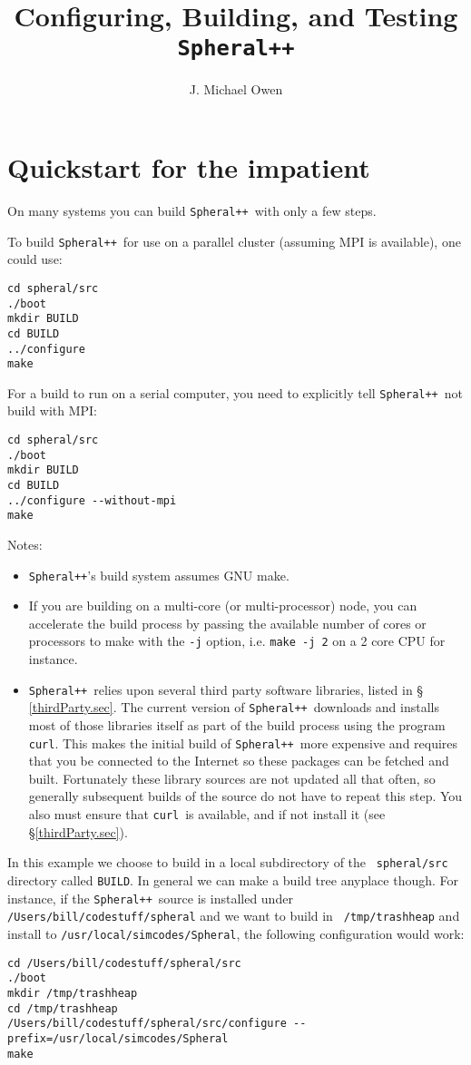 \documentclass{article}
\newcommand{\Spheral}{{\tt Spheral++}}
\newcommand{\curl}{{\tt curl}}
\begin{document}
\title{Configuring, Building, and Testing \Spheral}
\author{J. Michael Owen}
\maketitle

\section{Quickstart for the impatient}
\label{quick.sec}
On many systems you can build \Spheral\ with only a few steps.

To build \Spheral\ for use on a parallel cluster (assuming MPI is available),
one could use:
\begin{verbatim}
cd spheral/src
./boot
mkdir BUILD
cd BUILD
../configure
make
\end{verbatim}

For a build to run on a serial computer, you need to explicitly tell
\Spheral\ not build with MPI:
\begin{verbatim}
cd spheral/src
./boot
mkdir BUILD
cd BUILD
../configure --without-mpi
make
\end{verbatim}
Notes:
\begin{itemize}
\item \Spheral's build system assumes GNU make.
\item If you are building on a multi-core (or multi-processor) node, you can
  accelerate the build process by passing the available number of cores or
  processors to make with the \verb+-j+ option, i.e. \verb+make -j 2+ on a 2
  core CPU for instance.
\item \Spheral\ relies upon several third party software libraries, listed in \S
  \ref{thirdParty.sec}.  The current version of \Spheral\ downloads and installs
  most of those libraries itself as part of the build process using the program
  \curl.  This makes the initial build of \Spheral\ more expensive and requires
  that you be connected to the Internet so these packages can be fetched and
  built.  Fortunately these library sources are not updated all that often, so
  generally subsequent builds of the source do not have to repeat this step.
  You also must ensure that \curl\ is available, and if not install it (see
  \S\ref{thirdParty.sec}).
\end{itemize}

In this example we choose to build in a local subdirectory of the {\tt
  spheral/src} directory called {\tt BUILD}.  In general we can make a build
tree anyplace though.  For instance, if the \Spheral\ source is installed under
{\tt /Users/bill/codestuff/spheral} and we want to build in {\tt
  /tmp/trashheap} and install to {\tt /usr/local/simcodes/Spheral}, the
following configuration would work:
\begin{verbatim}
cd /Users/bill/codestuff/spheral/src
./boot
mkdir /tmp/trashheap
cd /tmp/trashheap
/Users/bill/codestuff/spheral/src/configure --prefix=/usr/local/simcodes/Spheral
make
\end{verbatim}
\end{document}
